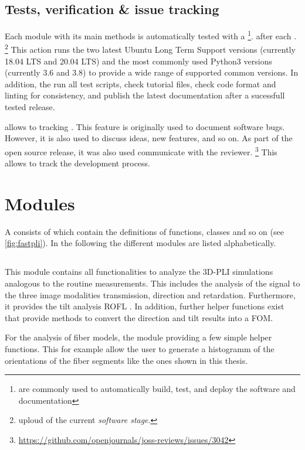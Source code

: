 \subsection{Tests, verification \& issue tracking}
%
Each module with its main methods is automatically tested with a  \footnote{ are commonly used to automatically build, test, and deploy the software and documentation}. after each .
\footnote{uploud of the current \textit{software stage}.}
This action runs the two latest Ubuntu Long Term Support versions (currently 18.04 LTS and 20.04 LTS) and the most commonly used Python3 versions (currently 3.6 and 3.8) to provide a wide range of supported common versions.
In addition, the  run all test scripts, check tutorial files, check code format and linting for consistency, and publish the latest documentation after a sucessfull tested release.
\par
%
 allows to tracking .
This feature is originally used to document software bugs.
However, it is also used to discuss ideas, new features, and so on.
As part of the open source release, it was also used communicate with the reviewer.
\footnote{\url{https://github.com/openjournals/joss-reviews/issues/3042}}
This allows to track the development process.
%
% 
% 
\section{Modules}
%
A \python{}  consists of  which contain the definitions of functions, classes and so on (see \cref{fig:fastpli}).
In the following the different modules are listed alphabetically.
%
%
%
\subsection{}
%
This module contains all functionalities to analyze the \ac{3D-PLI} simulations analogous to the routine measurements.
This includes the analysis of the signal to the three image modalities transmission, direction and retardation.
Furthermore, it provides the tilt analysis \ac{ROFL} \cite{Schmitz2018}.
In addition, further helper functions exist that provide methods to convert the direction and tilt results into a \ac{FOM}.
\par
% 
For the analysis of fiber models, the module providing a few simple helper functions.
This for example allow the user to generate a histogramm of the orientations of the fiber segments like the ones shown in this thesis.
%
% 
% 
